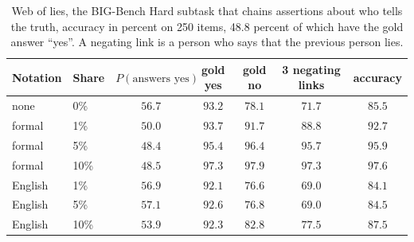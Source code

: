 \begin{table}[H]
\caption{Web of lies, the BIG-Bench Hard subtask that chains assertions about who tells the truth, accuracy in percent on 250 items, 48.8 percent of which have the gold answer ``yes''. A negating link is a person who says that the previous person lies.}
\label{tab:wol}
\begin{center}
\begin{tabular}{llccccc}
\toprule
Notation & Share & $P(\text{answers yes})$ & gold yes & gold no & 3 negating links & accuracy \\
\midrule
none    & 0\%  & $56.7$ & $93.2$ & $78.1$ & $71.7$ & $85.5$ \\
formal  & 1\%  & $50.0$ & $93.7$ & $91.7$ & $88.8$ & $92.7$ \\
formal  & 5\%  & $48.4$ & $95.4$ & $96.4$ & $95.7$ & $95.9$ \\
formal  & 10\% & $48.5$ & $97.3$ & $\mathbf{97.9}$ & $\mathbf{97.3}$ & $\mathbf{97.6}$ \\
English & 1\%  & $56.9$ & $92.1$ & $76.6$ & $69.0$ & $84.1$ \\
English & 5\%  & $57.1$ & $92.6$ & $76.8$ & $69.0$ & $84.5$ \\
English & 10\% & $53.9$ & $92.3$ & $82.8$ & $77.5$ & $87.5$ \\
\bottomrule
\end{tabular}
\end{center}
\end{table}
